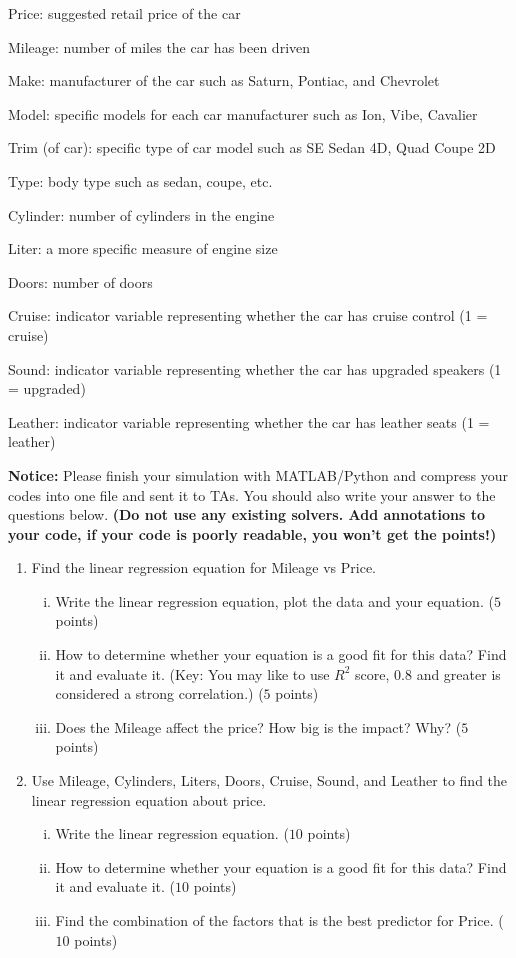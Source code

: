 \documentclass{article}
\begin{document}
Price: suggested retail price of the car 

Mileage: number of miles the car has been driven

Make: manufacturer of the car such as Saturn, Pontiac, and Chevrolet

Model: specific models for each car manufacturer such as Ion, Vibe, Cavalier

Trim (of car): specific type of car model such as SE Sedan 4D, Quad Coupe 2D

Type: body type such as sedan, coupe, etc.

Cylinder: number of cylinders in the engine	

Liter: a more specific measure of engine size	

Doors: number of doors	

Cruise: indicator variable representing whether the car has cruise control (1 = cruise)

Sound: indicator variable representing whether the car has upgraded speakers (1 = upgraded)

Leather: indicator variable representing whether the car has leather seats (1 = leather)

\textbf{Notice:} Please finish your simulation with MATLAB/Python and compress your codes into one file and sent it to TAs. You should also write your answer to the questions below. \textbf{(Do not use any existing solvers. Add annotations to your code, if your code is poorly readable, you won't get the points!)}


\begin{enumerate}[(1)]
\item Find the linear regression equation for Mileage vs Price.
\begin{enumerate}[(i)]
\item Write the linear regression equation,  plot the data and your equation. ($5$ points)

\item How to determine whether your equation is a good fit for this data? Find it and evaluate it. (Key: You may like to use $R^2$ score, 0.8 and greater is considered a strong correlation.) ($5$ points)

\item Does the Mileage affect the price? How big is the impact? Why? ($5$ points)
\end{enumerate}
\item Use Mileage, Cylinders, Liters, Doors, Cruise, Sound, and Leather to find the linear regression equation about price.
\begin{enumerate}[(i)]
\item Write the linear regression equation. ($10$ points)

\item How to determine whether your equation is a good fit for this data? Find it and evaluate it. ($10$ points)

\item Find the combination of the factors that is the best predictor for Price. ($10$ points)

\end{enumerate}
\end{enumerate}

\end{document}
